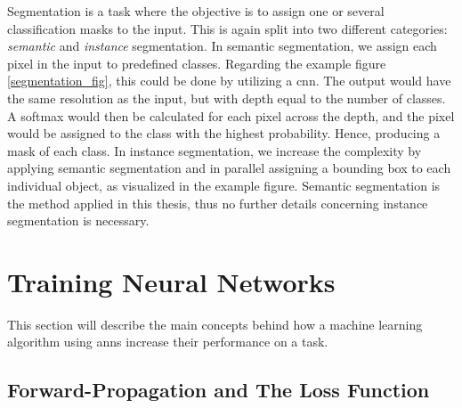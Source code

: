     Segmentation is a task where the objective is to assign one or several classification masks to the input\cite{He_2017_ICCV_segmentation}. This is again split into two different categories: \textit{semantic} and \textit{instance} segmentation. In semantic segmentation, we assign each pixel in the input to predefined classes. Regarding the example figure \ref{segmentation_fig}, this could be done by utilizing a \gls{cnn}. The output would have the same resolution as  the input, but with depth equal to the number of classes. A softmax would then be calculated for each pixel across the depth, and the pixel would be assigned to the class with the highest probability. Hence, producing a mask of each class. In instance segmentation, we increase the complexity by applying semantic segmentation and in parallel assigning a bounding box to each individual object, as visualized in the example figure. Semantic segmentation is the method applied in this thesis, thus no further details concerning instance segmentation is necessary.
\section{Training Neural Networks} \label{training neural networks}
    This section will describe the main concepts behind how a machine learning algorithm using \gls{ann}s increase their performance on a task. 

\subsection{Forward-Propagation and The Loss Function}

